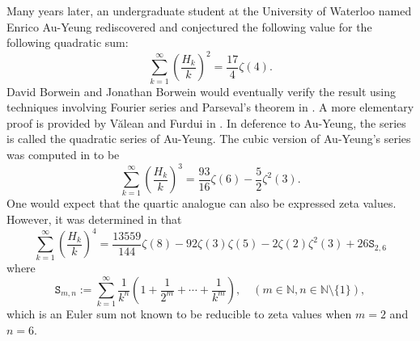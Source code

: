 \documentclass[10pt]{amsart}
\theoremstyle{definition}
\begin{document}
Many years later, an undergraduate student at the University of Waterloo named Enrico Au-Yeung rediscovered and conjectured the following value for the following quadratic sum:
\begin{equation} \label{Au-Yeung}
    \sum_{k=1}^\infty \left(\frac{H_k}{k}\right)^2 = \frac{17}{4}\zeta(4).
\end{equation}
David Borwein and Jonathan Borwein would eventually verify the result using techniques involving Fourier series and Parseval's theorem in \cite{Borwein}. A more elementary proof is provided by V{\u{a}}lean and Furdui in \cite{FurduiValean}. In deference to Au-Yeung, the series is called the quadratic series of Au-Yeung. The cubic version of Au-Yeung's series was computed in \cite{Valean3} to be
$$\sum_{k=1}^\infty \left(\frac{H_k}{k}\right)^3 = \frac{93}{16}\zeta(6) - \frac{5}{2}\zeta^2(3).$$
One would expect that the quartic analogue can also be expressed zeta values. However, it was determined in \cite{EulerStirling} that
$$\sum_{k=1}^\infty \left(\frac{H_k}{k}\right)^4 = \frac{13559}{144}\zeta(8) - 92\zeta(3)\zeta(5) -2\zeta(2)\zeta^2(3) + 26\texttt{S}_{2,6}$$
where
$$\texttt{S}_{m,n} := \sum_{k=1}^\infty \frac{1}{k^n}\left(1 + \frac{1}{2^m} + \cdots + \frac{1}{k^m}\right), \quad (m \in \mathbb{N}, n\in \mathbb{N}\setminus\{1\}),$$
which is an Euler sum not known to be reducible to zeta values when $m=2$ and $n=6$.
\end{document}
